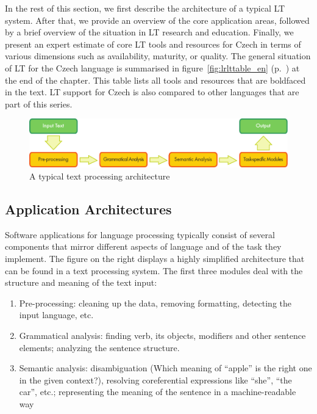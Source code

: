\begin{multicols}{2}
In the rest of this section, we first describe the architecture of a typical LT system. After that, we provide an overview of the core application areas, followed by a brief overview of the situation in LT research and education. Finally, we present an expert estimate of core LT tools and resources for Czech in terms of various dimensions such as availability, maturity, or quality. The general situation of LT for the Czech language is summarised in figure~\ref{fig:lrlttable_en} (p.~\pageref{fig:lrlttable_en}) at the end of the chapter. This table lists all tools and resources that are boldfaced in the text. LT support for Czech is also compared to other languages that are part of this series.

\begin{figure}[b]
  \center
  \includegraphics[width=\textwidth]{../_media/english/text_processing_app_architecture}
  \caption{A typical text processing architecture}
\label{fig:textprocessingarch_en}
\end{figure}

\subsection{Application Architectures}
Software applications for language processing typically consist of several components that mirror different aspects of language and of the task they implement. The figure on the right displays a highly simplified architecture that can be found in a text processing system. The first three modules deal with the structure and meaning of the text input:

\begin{enumerate}
\item Pre-processing: cleaning up the data, removing formatting, detecting the input language, etc.
\item Grammatical analysis: finding verb, its objects, modifiers and other sentence elements; analyzing the sentence structure.
\item Semantic analysis: disambiguation (Which meaning of “apple” is the right one in the given context?), resolving coreferential expressions like “she”, “the car”, etc.; representing the meaning of the sentence in a machine-readable way
\end{enumerate}


\end{multicols}
